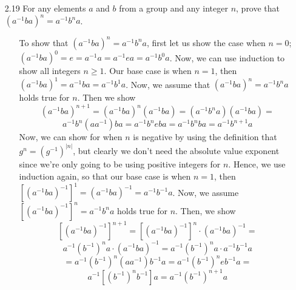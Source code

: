 \documentclass[12pt]{article}
\begin{document}
\begin{enumerate}
\item[2.19] For any elements $a$ and $b$ from a group and any integer $n$, prove
that $(a^{-1}ba)^n = a^{-1}b^na$.
\begin{enumerate}
\item[] To show that $(a^{-1}ba)^n = a^{-1}b^na$, first let us show the case when $n = 0$; \\
$(a^{-1}ba)^0 = e = a^{-1}a = a^{-1}ea = a^{-1}b^0a$. 
Now, we can use induction to show all integers $n \geq 1$. Our base case is when
$n = 1$, then $(a^{-1}ba)^1 = a^{-1}ba = a^{-1}b^1a$. Now, we assume that 
$(a^{-1}ba)^n = a^{-1}b^na$ holds true for $n$. Then we show 
\[ (a^{-1}ba)^{n + 1} = (a^{-1}ba)^n(a^{-1}ba) = (a^{-1}b^na)(a^{-1}ba) = \] 
\[ a^{-1}b^n(aa^{-1})ba = a^{-1}b^neba = a^{-1}b^nba = a^{-1}b^{n + 1}a \]
Now, we can show for when $n$ is negative by using the definition that 
$g^n = (g^{-1})^{|n|}$, but clearly we don't need the absolute value exponent
since we're only going to be using positive integers for $n$. Hence, we use induction again,
so that our base case is when $n = 1$, then $[(a^{-1}ba)^{-1}]^1 = (a^{-1}ba)^{-1} = a^{-1}b^{-1}a$.
Now, we assume $[(a^{-1}ba)^{-1}]^n = a^{-1}b^na$ holds true for $n$. Then, we show
\[ 
[(a^{-1}ba)^{-1}]^{n + 1} = [(a^{-1}ba)^{-1}]^n \cdot (a^{-1}ba)^{-1} = 
\]
\[
a^{-1}(b^{-1})^na \cdot (a^{-1}ba)^{-1} = a^{-1}(b^{-1})^na \cdot a^{-1}b^{-1}a 
\]
\[
= a^{-1}(b^{-1})^n(aa^{-1})b^{-1}a = a^{-1}(b^{-1})^neb^{-1}a = 
\]
\[ 
a^{-1}[(b^{-1})^nb^{-1}]a = a^{-1}(b^{-1})^{n + 1}a 
\]

\end{enumerate}



\end{enumerate}
\end{document}
